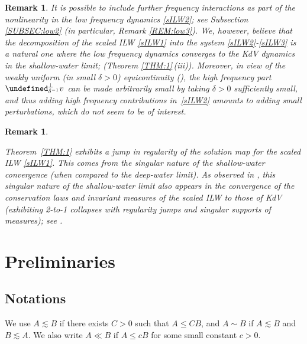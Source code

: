 \documentclass[letterpaper, 11pt,  reqno]{amsart}
\newtheorem{remark}[theorem]{Remark}
\newcommand{\1}{\hspace{0.5mm}\textup{I}\hspace{0.5mm}}
\let\P= \undefined
\newcommand{\P}{\mathbf{P}}
\newcommand{\dl}{\delta}
\newcommand{\les}{\lesssim}
\numberwithin{equation}{section}
\numberwithin{theorem}{section}
\begin{document}
\begin{remark}\label{REM:low4}\rm
It is possible to include further frequency interactions
as part of the nonlinearity in the low frequency dynamics \eqref{sILW2};
see Subsection \ref{SUBSEC:low2}
(in particular, Remark \ref{REM:low3}).
We, however, believe that the decomposition 
of the scaled ILW \eqref{sILW1}
into the system \eqref{sILW2}-\eqref{sILW3}
is a natural one where the low frequency 
dynamics converges to the KdV dynamics in the shallow-water limit;
(Theorem \ref{THM:1}\,(iii)).
Moreover, in view of 
the weakly uniform (in small $\dl > 0$) equicontinuity (\cite[Proposition 1.4]{CLOZ}), 
the high frequency part $\P_{ \dl^{-1}}^\perp v$
can be made arbitrarily small by taking $\dl > 0$ sufficiently small, 
and thus adding high frequency contributions
in~\eqref{sILW2} amounts to adding
small perturbations, which do not seem to be of interest.


\end{remark}






\begin{remark}\label{REM:sing}\rm


Theorem~\ref{THM:1}
exhibits a jump in regularity 
of the solution map for the scaled ILW \eqref{sILW1}.
This comes from the singular nature of the shallow-water convergence
(when compared to the deep-water limit).
As observed in \cite{LOZ, CLO},  
this singular nature of the shallow-water limit
also appears in
the convergence of  the conservation laws 
and invariant measures of the scaled ILW
to those of KdV
(exhibiting 
2-to-1 collapses
with regularity jumps and singular supports of measures);
see 
\cite[Remark~1.2]{CLO}.



\end{remark}












\section{Preliminaries}
\label{SEC:2}


\subsection{Notations}
We use $A\les B$ if there exists $C>0$ such that $A \le CB$, and $A\sim B$ if $A \les B$ and $B \les A$. 
We also write $A \ll B$ if $A \le c B$ for some small constant $c>0$. 
\end{document}
